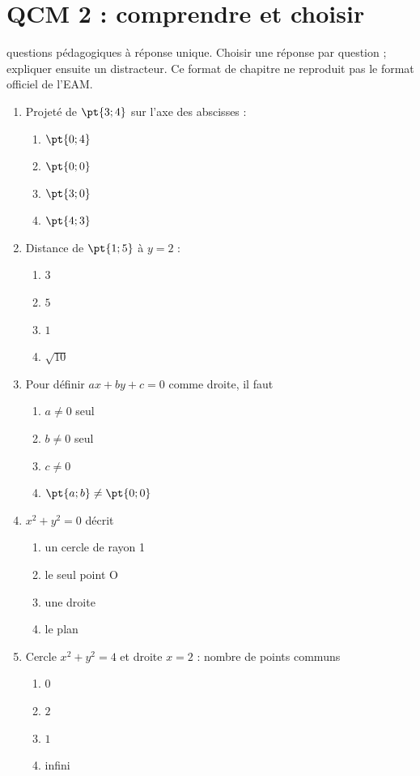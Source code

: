 \endgroup
\begingroup\small
{}\section*{QCM 2 : comprendre et choisir}\label{C07-Q2}
 questions pédagogiques à réponse unique. Choisir une réponse par question ; expliquer ensuite un distracteur. Ce format de chapitre ne reproduit pas le format officiel de l’EAM.
\begin{enumerate}
\item Projeté de $\pt{3;4}$ sur l’axe des abscisses :
\begin{enumerate}[label=\Alph*.,itemsep=2pt]
\item $\pt{0;4}$
\item $\pt{0;0}$
\item $\pt{3;0}$
\item $\pt{4;3}$
\end{enumerate}
\item Distance de $\pt{1;5}$ à $y=2$ :
\begin{enumerate}[label=\Alph*.,itemsep=2pt]
\item $3$
\item $5$
\item $1$
\item $\sqrt{10}$
\end{enumerate}
\item Pour définir $ax+by+c=0$ comme droite, il faut
\begin{enumerate}[label=\Alph*.,itemsep=2pt]
\item $a\ne0$ seul
\item $b\ne0$ seul
\item $c\ne0$
\item $\pt{a;b}\ne\pt{0;0}$
\end{enumerate}
\item $x^2+y^2=0$ décrit
\begin{enumerate}[label=\Alph*.,itemsep=2pt]
\item un cercle de rayon 1
\item le seul point O
\item une droite
\item le plan
\end{enumerate}
\item Cercle $x^2+y^2=4$ et droite $x=2$ : nombre de points communs
\begin{enumerate}[label=\Alph*.,itemsep=2pt]
\item $0$
\item $2$
\item $1$
\item infini
\end{enumerate}
\end{enumerate}
